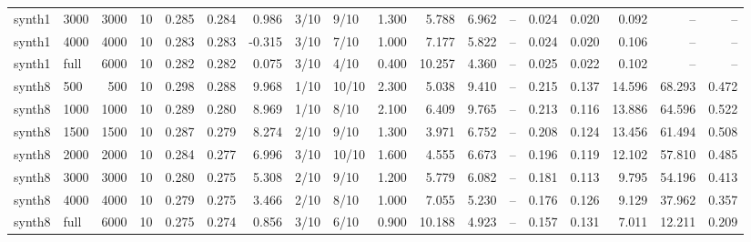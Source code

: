 \begin{tabular}{llrrrrrllrrrlrrrrr}
synth1 & 3000 & 3000 & 10 & 0.285 & 0.284 & 0.986 & 3/10 & 9/10 & 1.300 & 5.788 & 6.962 & -- & 0.024 & 0.020 & 0.092 & -- & -- \\
synth1 & 4000 & 4000 & 10 & 0.283 & 0.283 & -0.315 & 3/10 & 7/10 & 1.000 & 7.177 & 5.822 & -- & 0.024 & 0.020 & 0.106 & -- & -- \\
synth1 & full & 6000 & 10 & 0.282 & 0.282 & 0.075 & 3/10 & 4/10 & 0.400 & 10.257 & 4.360 & -- & 0.025 & 0.022 & 0.102 & -- & -- \\
synth8 & 500 & 500 & 10 & 0.298 & 0.288 & 9.968 & 1/10 & 10/10 & 2.300 & 5.038 & 9.410 & -- & 0.215 & 0.137 & 14.596 & 68.293 & 0.472 \\
synth8 & 1000 & 1000 & 10 & 0.289 & 0.280 & 8.969 & 1/10 & 8/10 & 2.100 & 6.409 & 9.765 & -- & 0.213 & 0.116 & 13.886 & 64.596 & 0.522 \\
synth8 & 1500 & 1500 & 10 & 0.287 & 0.279 & 8.274 & 2/10 & 9/10 & 1.300 & 3.971 & 6.752 & -- & 0.208 & 0.124 & 13.456 & 61.494 & 0.508 \\
synth8 & 2000 & 2000 & 10 & 0.284 & 0.277 & 6.996 & 3/10 & 10/10 & 1.600 & 4.555 & 6.673 & -- & 0.196 & 0.119 & 12.102 & 57.810 & 0.485 \\
synth8 & 3000 & 3000 & 10 & 0.280 & 0.275 & 5.308 & 2/10 & 9/10 & 1.200 & 5.779 & 6.082 & -- & 0.181 & 0.113 & 9.795 & 54.196 & 0.413 \\
synth8 & 4000 & 4000 & 10 & 0.279 & 0.275 & 3.466 & 2/10 & 8/10 & 1.000 & 7.055 & 5.230 & -- & 0.176 & 0.126 & 9.129 & 37.962 & 0.357 \\
synth8 & full & 6000 & 10 & 0.275 & 0.274 & 0.856 & 3/10 & 6/10 & 0.900 & 10.188 & 4.923 & -- & 0.157 & 0.131 & 7.011 & 12.211 & 0.209 \\
\bottomrule
\end{tabular}

